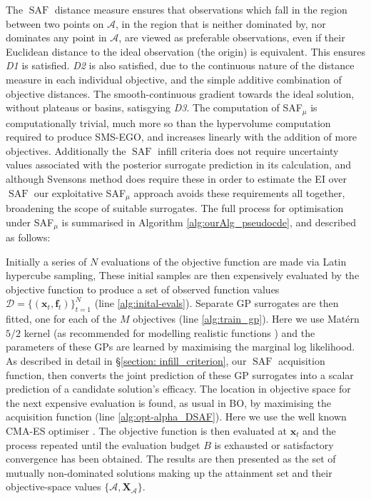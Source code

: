 \documentclass[conference]{IEEEtran}
\newcommand{\evaluatedx}{\bX}
\newcommand{\attainmentfront}{\mathcal{A}}
\newcommand{\attainmentset}{\evaluatedx_{\mathcal{A}}}
\newcommand{\ninitialevaluations}{N}
\newcommand{\nbudget}{B}
\newcommand{\nobj}{M}
\DeclareMathOperator*{\saf}{SAF}
\newcommand\safmu{SAF$_{\mu}$\xspace}
\newcommand\smsego{SMS-EGO\xspace}
\newcommand\ei{EI\xspace}
\newcommand\gp{GP\xspace}
\newcommand\gps{GPs\xspace}
\newcommand{\bx}{\mathbf{x}}
\newcommand{\bX}{\mathbf{X}}
\newcommand{\bff}{\mathbf{f}}
\newcommand{\data}{\mathcal{D}}
\begin{document}
The $\saf$ distance measure ensures that observations which fall in the region between two points on $\attainmentfront$, in the region that is neither dominated by, nor dominates any point in $\attainmentfront$, are viewed as preferable observations, even if their Euclidean distance to the ideal observation (the origin) is equivalent. This ensures \textit{D1} is satisfied. \textit{D2} is also satisfied, due to the continuous nature of the distance measure in each individual objective, and the simple additive combination of objective distances. The smooth-continuous gradient towards the ideal solution, without plateaus or basins, satisgying \textit{D3}. The computation of \safmu is computationally trivial, much more so than the hypervolume computation required to produce \smsego, and increases linearly with the addition of more objectives. Additionally the $\saf$ infill criteria does not require uncertainty values associated with the posterior surrogate prediction in its calculation, and although Svensons \cite{svenson2016multiobjective} method does require these in order to estimate the \ei over $\saf$ our exploitative \safmu approach avoids these requirements all together, broadening the scope of suitable surrogates. The full process for optimisation under \safmu is summarised in Algorithm  \ref{alg:ourAlg_pseudocde}, and described as follows:

Initially a series of $\ninitialevaluations$ evaluations of the objective function are made via  Latin hypercube sampling, These initial samples are then expensively evaluated by the objective function to produce a set of observed function values  $\data = \{(\bx_t, \bff_t)\}_{t=1}^{\ninitialevaluations}$ (line \ref{alg:inital-evals}). Separate \gp surrogates are then fitted, one for each of the $\nobj$ objectives (line \ref{alg:train_gp}). Here we use Mat{\'e}rn $5/2$ kernel (as recommended for modelling realistic functions \cite{snoek2012practical}) and the parameters of these \gps are
learned by maximising the marginal log likelihood. As described in detail in \S\ref{section: infill_criterion}, our $\saf$ acquisition function, then converts the joint prediction
of these GP surrogates into a scalar prediction of a candidate solution's
efficacy. The location in objective space for the next expensive
evaluation is found, as usual in BO, by maximising the acquisition function
(line \ref{alg:opt-alpha_DSAF}).  Here we use the well known CMA-ES optimiser
 \cite{hansen2003reducing}. The objective function is then evaluated at
 $\mathbf{x}_t$ and the process repeated until the evaluation budget $\nbudget$ is
 exhausted or satisfactory convergence has been obtained. The results are then presented as the set of mutually non-dominated solutions making up the attainment set and their objective-space values $\{\attainmentfront, \attainmentset\}$.
\end{document}
